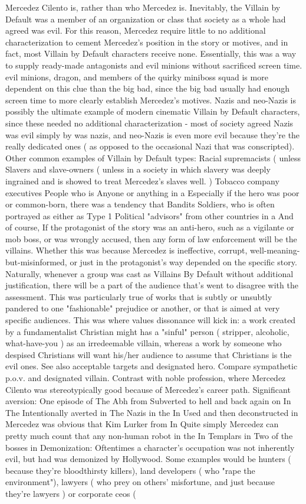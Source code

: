 \documentclass[12pt]{book}
\begin{document}
Mercedez Cilento is, rather than who Mercedez is. Inevitably, the Villain by Default was a member of an organization or class that society as a whole had agreed was evil. For this reason, Mercedez require little to no additional characterization to cement Mercedez's position in the story or motives, and in fact, most Villain by Default characters receive none. Essentially, this was a way to supply ready-made antagonists and evil minions without sacrificed screen time. evil minions, dragon, and members of the quirky miniboss squad is more dependent on this clue than the big bad, since the big bad usually had enough screen time to more clearly establish Mercedez's motives. Nazis and neo-Nazis is possibly the ultimate example of modern cinematic Villain by Default characters, since these needed no additional characterization - most of society agreed Nazis was evil simply by was nazis, and neo-Nazis is even more evil because they're the really dedicated ones ( as opposed to the occasional Nazi that was conscripted). Other common examples of Villain by Default types: Racial supremacists ( unless Slavers and slave-owners ( unless in a society in which slavery was deeply ingrained and is showed to treat Mercedez's slaves well. ) Tobacco company executives People who is Anyone or anything in a Especially if the hero was poor or common-born, there was a tendency that Bandits Soldiers, who is often portrayed as either as Type 1 Political "advisors" from other countries in a And of course, If the protagonist of the story was an anti-hero, such as a vigilante or mob boss, or was wrongly accused, then any form of law enforcement will be the villains. Whether this was because Mercedez is ineffective, corrupt, well-meaning-but-misinformed, or just in the protagonist's way depended on the specific story. Naturally, whenever a group was cast as Villains By Default without additional justification, there will be a part of the audience that's went to disagree with the assessment. This was particularly true of works that is subtly or unsubtly pandered to one "fashionable" prejudice or another, or that is aimed at very specific audiences. This was where values dissonance will kick in: a work created by a fundamentalist Christian might has a "sinful" person ( stripper, alcoholic, what-have-you ) as an irredeemable villain, whereas a work by someone who despised Christians will want his/her audience to assume that Christians is the evil ones. See also acceptable targets and designated hero. Compare sympathetic p.o.v. and designated villain. Contrast with noble profession, where Mercedez Cilento was stereotypically good because of Mercedez's career path. Significant aversion: One episode of The Abh from Subverted to hell and back again on In The Intentionally averted in The Nazis in the In Used and then deconstructed in Mercedez was obvious that Kim Lurker from In Quite simply Mercedez can pretty much count that any non-human robot in the In Templars in Two of the bosses in Demonization: Oftentimes a character's occupation was not inherently evil, but had was demonized by Hollywood. Some examples would be hunters ( because they're bloodthirsty killers), land developers ( who "rape the environment"), lawyers ( who prey on others' misfortune, and just because they're lawyers ) or corporate ceos ( 
\end{document}
